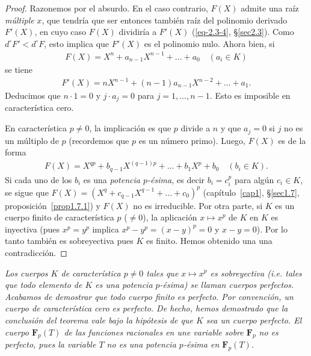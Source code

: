 \documentclass[oneside,bibtotoc,leqno,spanish]{amsbook}
\newcommand{\FF}{\mathbf{F}}
\numberwithin{equation}{section}
\newenvironment{comm}%
	{\begin{trivlist}\item\small\itshape}
	{\end{trivlist}}
\theoremstyle{defi}
\theoremstyle{note}
\theoremstyle{rem}
\numberwithin{theorem}{section}
\numberwithin{proposition}{section}
\numberwithin{definition}{section}
\numberwithin{lemma}{section}
\numberwithin{corollary}{section}
\numberwithin{example}{section}
\numberwithin{footnote}{section}%
\begin{document}
\begin{proof}
Razonemos por el absurdo. En el caso contrario, $F(X)$ admite una ra\'iz \emph{m\'ultiple} $x$, que
tendr\'ia que ser entonces tambi\'en ra\'iz del polinomio derivado $F'(X)$, en cuyo caso $F(X)$
dividir\'ia a $F'(X)$ (\eqref{eq-2.3-4}, \S\ref{sec2.3}). Como $d^{\circ}F' < d^{\circ}F$, esto implica que $F'(X)$ es el
polinomio nulo. Ahora bien, si
\begin{gather*}
F(X) = X^{n}+a_{n-1}X^{n-1}+\dots+a_{0}\quad(a_{i}\in K)
\end{gather*}
se tiene
\begin{gather*}
F'(X) = nX^{n-1}+(n-1)a_{n-1}X^{n-2}+\dots+a_{1}.
\end{gather*}
Deducimos que $n\cdot 1 = 0$ y $j\cdot a_{j} = 0$ para $j=1,\dots,n-1$. Esto es imposible en caracter\'istica
cero.

En caracter\'istica $p\neq 0$, la implicaci\'on es que $p$ divide a $n$ y que $a_{j} = 0$ si $j$ no es
un m\'ultiplo de $p$ (recordemos que $p$ es un n\'umero primo). Luego, $F(X)$ es de la forma
\begin{gather*}
F(X) = X^{qp}+b_{q-1}X^{(q-1)p}+\dots+b_{1}X^{p}+b_{0}\quad(b_{i}\in K).
\end{gather*}
Si cada uno de los $b_{i}$ es una \emph{potencia $p$-\'esima,} es decir $b_{i} = c_{i}^{p}$ para
alg\'un $c_{i}\in K$, se sigue que $F(X) = (X^{q}+c_{q-1}X^{q-1}+\dots+c_{0})^{p}$ (cap\'itulo~\ref{cap1}, \S\ref{sec1.7},
proposici\'on~\ref{prop1.7.1}) y $F(X)$ no es irreducible. Por otra parte, si $K$ es un cuerpo finito de caracter\'istica $p$
($\neq 0$), la aplicaci\'on $x\mapsto x^{p}$ de $K$ en $K$ es inyectiva (pues
$x^{p}=y^{p}$ implica $x^{p}-y^{p} = (x-y)^{p} = 0$ y $x-y=0$). Por lo tanto tambi\'en es sobreyectiva
pues $K$ es finito. Hemos obtenido una una contradicci\'on.
\end{proof}

\begin{comm}
Los cuerpos $K$ de caracter\'istica $p\neq 0$ tales que $x\mapsto x^{p}$ es sobreyectiva
(i.e. tales que todo elemento de $K$ es una potencia $p$-\'esima) se llaman cuerpos \emph{perfectos.}
Acabamos de demostrar que todo cuerpo finito es perfecto. Por convenci\'on, un cuerpo de caracter\'istica
cero es perfecto. De hecho, hemos demostrado que la conclusi\'on del teorema vale bajo la hip\'otesis
de que $K$ sea un cuerpo perfecto. El cuerpo $\FF_{p}(T)$ de las funciones racionales en une variable
sobre $\FF_{p}$ no es perfecto, pues la variable $T$ no es una potencia $p$-\'esima en $\FF_{p}(T)$.
\end{comm}
\end{document}
